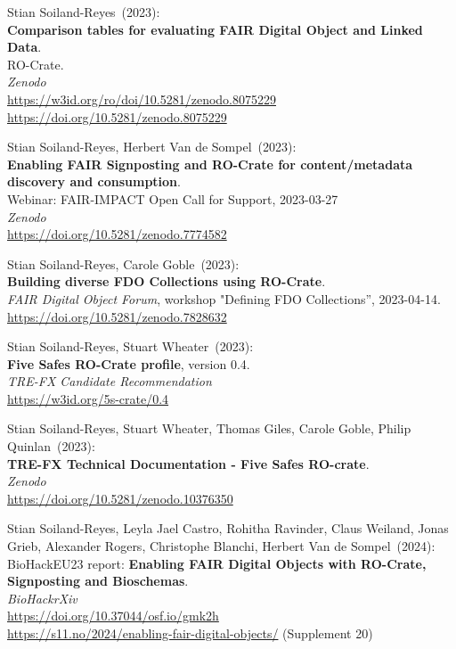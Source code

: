\begin{thebibliography}{9}
Stian Soiland-Reyes~(2023): \\
\textbf{Comparison tables for evaluating FAIR Digital Object and Linked Data}.\\
RO-Crate. \\
\emph{Zenodo}\\
\url{https://w3id.org/ro/doi/10.5281/zenodo.8075229}\\
\url{https://doi.org/10.5281/zenodo.8075229}

Stian Soiland-Reyes, Herbert Van de Sompel~(2023): \\
\textbf{Enabling FAIR Signposting and RO-Crate for content/metadata discovery and consumption}.\\
Webinar: FAIR-IMPACT Open Call for Support, 2023-03-27 \\
\emph{Zenodo} \\
\url{https://doi.org/10.5281/zenodo.7774582}

Stian Soiland-Reyes, Carole Goble~(2023): \\
\textbf{Building diverse FDO Collections using RO-Crate}.\\
\emph{FAIR Digital Object Forum}, workshop "Defining FDO Collections”, 2023-04-14.\\
\url{https://doi.org/10.5281/zenodo.7828632}

Stian Soiland-Reyes, Stuart Wheater~(2023): \\
\textbf{Five Safes RO-Crate profile}, version 0.4.\\
\emph{TRE-FX Candidate Recommendation} \\
\url{https://w3id.org/5s-crate/0.4}

Stian Soiland-Reyes, Stuart Wheater, Thomas Giles, Carole Goble, Philip Quinlan~(2023):\\  \textbf{TRE-FX Technical Documentation - Five Safes RO-crate}.  \\
\emph{Zenodo} \\
\url{https://doi.org/10.5281/zenodo.10376350}

Stian Soiland-Reyes, Leyla Jael Castro, Rohitha Ravinder, Claus Weiland, Jonas Grieb, Alexander Rogers, Christophe Blanchi, Herbert Van de Sompel~(2024): \\
BioHackEU23 report: \textbf{Enabling FAIR Digital Objects with RO-Crate, Signposting and Bioschemas}. \\
\emph{BioHackrXiv} \\
\url{https://doi.org/10.37044/osf.io/gmk2h}\\
\url{https://s11.no/2024/enabling-fair-digital-objects/} (Supplement 20)



\end{thebibliography}
